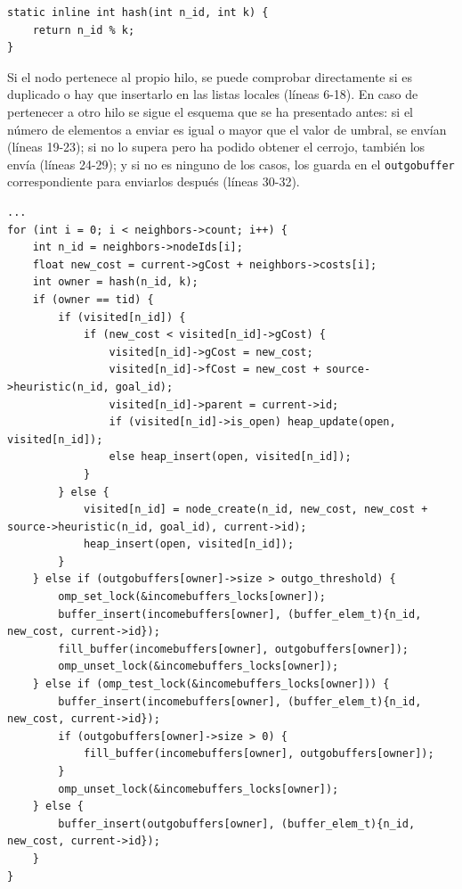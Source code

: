 \documentclass[a4paper,12pt]{article}
\begin{document}
\begin{lstlisting}
static inline int hash(int n_id, int k) {
    return n_id % k;
}
\end{lstlisting}

\noindent Si el nodo pertenece al propio hilo, se puede comprobar directamente si es duplicado o hay que insertarlo en las listas locales (líneas 6-18). En caso de pertenecer a otro hilo se sigue el esquema que se ha presentado antes: si el número de elementos a enviar es igual o mayor que el valor de umbral, se envían (líneas 19-23); si no lo supera pero ha podido obtener el cerrojo, también los envía (líneas 24-29); y si no es ninguno de los casos, los guarda en el \verb|outgobuffer| correspondiente para enviarlos después (líneas 30-32).

\clearpage

{\lstset{frame=trbl,
         numbers=left,
         title=Evaluación de los nodos vecinos en HDA*,
         label=expansion}
\begin{lstlisting}
...
for (int i = 0; i < neighbors->count; i++) {
    int n_id = neighbors->nodeIds[i];
    float new_cost = current->gCost + neighbors->costs[i];
    int owner = hash(n_id, k);
    if (owner == tid) {
        if (visited[n_id]) {
            if (new_cost < visited[n_id]->gCost) {
                visited[n_id]->gCost = new_cost;
                visited[n_id]->fCost = new_cost + source->heuristic(n_id, goal_id);
                visited[n_id]->parent = current->id;
                if (visited[n_id]->is_open) heap_update(open, visited[n_id]);
                else heap_insert(open, visited[n_id]);
            }
        } else {
            visited[n_id] = node_create(n_id, new_cost, new_cost + source->heuristic(n_id, goal_id), current->id);
            heap_insert(open, visited[n_id]);
        }
    } else if (outgobuffers[owner]->size > outgo_threshold) {
        omp_set_lock(&incomebuffers_locks[owner]);
        buffer_insert(incomebuffers[owner], (buffer_elem_t){n_id, new_cost, current->id});
        fill_buffer(incomebuffers[owner], outgobuffers[owner]);
        omp_unset_lock(&incomebuffers_locks[owner]);
    } else if (omp_test_lock(&incomebuffers_locks[owner])) {
        buffer_insert(incomebuffers[owner], (buffer_elem_t){n_id, new_cost, current->id});
        if (outgobuffers[owner]->size > 0) {
            fill_buffer(incomebuffers[owner], outgobuffers[owner]);
        }
        omp_unset_lock(&incomebuffers_locks[owner]);
    } else {
        buffer_insert(outgobuffers[owner], (buffer_elem_t){n_id, new_cost, current->id});
    }
}
\end{lstlisting}
}
\end{document}
